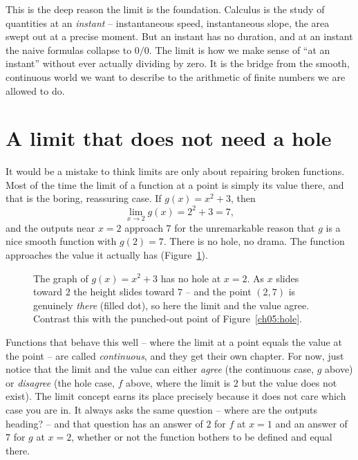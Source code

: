 \begin{aestheticbox}
This is the deep reason the limit is the foundation. Calculus is the study of quantities at an
\emph{instant} -- instantaneous speed, instantaneous slope, the area swept out at a precise
moment. But an instant has no duration, and at an instant the naive formulas collapse to $0/0$.
The limit is how we make sense of ``at an instant'' without ever actually dividing by zero. It
is the bridge from the smooth, continuous world we want to describe to the arithmetic of finite
numbers we are allowed to do.
\end{aestheticbox}

\section{A limit that does not need a hole}

It would be a mistake to think limits are only about repairing broken functions. Most of the
time the limit of a function at a point is simply its value there, and that is the boring,
reassuring case. If $g(x) = x^2 + 3$, then
\[
  \lim_{x \to 2} g(x) = 2^2 + 3 = 7,
\]
and the outputs near $x = 2$ approach $7$ for the unremarkable reason that $g$ is a nice smooth
function with $g(2) = 7$. There is no hole, no drama. The function approaches the value it
actually has (Figure~\ref{ch05:nohole}).

\begin{figure}[H]
\centering
{}
\caption{The graph of $g(x)=x^2+3$ has no hole at $x=2$. As $x$ slides toward $2$ the height
slides toward $7$ -- and the point $(2,7)$ is genuinely \emph{there} (filled dot), so here the
limit and the value agree. Contrast this with the punched-out point of Figure~\ref{ch05:hole}.}
\label{ch05:nohole}
\end{figure}

Functions that behave this well -- where the limit at a point equals the value at the point --
are called \emph{continuous}, and they get their own chapter. For now, just notice that the
limit and the value can either \emph{agree} (the continuous case, $g$ above) or \emph{disagree}
(the hole case, $f$ above, where the limit is $2$ but the value does not exist). The limit
concept earns its place precisely because it does not care which case you are in. It always asks the
same question -- where are the outputs heading? -- and that question has an answer of $2$ for
$f$ at $x=1$ and an answer of $7$ for $g$ at $x=2$, whether or not the function bothers to be
defined and equal there.

